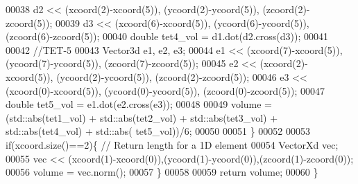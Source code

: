 \begin{DoxyCode}
00038     d2 << (xcoord(2)-xcoord(5)), (ycoord(2)-ycoord(5)), (zcoord(2)-zcoord(5));
00039     d3 << (xcoord(6)-xcoord(5)), (ycoord(6)-ycoord(5)), (zcoord(6)-zcoord(5));
00040     \textcolor{keywordtype}{double} tet4\_vol = d1.dot(d2.cross(d3));
00041 
00042     \textcolor{comment}{//TET-5}
00043     Vector3d e1, e2, e3;
00044     e1 << (xcoord(7)-xcoord(5)), (ycoord(7)-ycoord(5)), (zcoord(7)-zcoord(5));
00045     e2 << (xcoord(2)-xcoord(5)), (ycoord(2)-ycoord(5)), (zcoord(2)-zcoord(5));
00046     e3 << (xcoord(0)-xcoord(5)), (ycoord(0)-ycoord(5)), (zcoord(0)-zcoord(5));
00047     \textcolor{keywordtype}{double} tet5\_vol = e1.dot(e2.cross(e3));
00048 
00049     volume = (std::abs(tet1\_vol) + std::abs(tet2\_vol) + std::abs(tet3\_vol) + std::abs(tet4\_vol) + std::abs(
      tet5\_vol))/6;
00050 
00051 \}
00052 
00053 \textcolor{keywordflow}{if}(xcoord.size()==2)\{ \textcolor{comment}{// Return length for a 1D element}
00054     VectorXd vec;
00055     vec << (xcoord(1)-xcoord(0)),(ycoord(1)-ycoord(0)),(zcoord(1)-zcoord(0));
00056     volume = vec.norm();
00057 \}
00058 
00059     \textcolor{keywordflow}{return} volume;
00060 \}
\end{DoxyCode}
